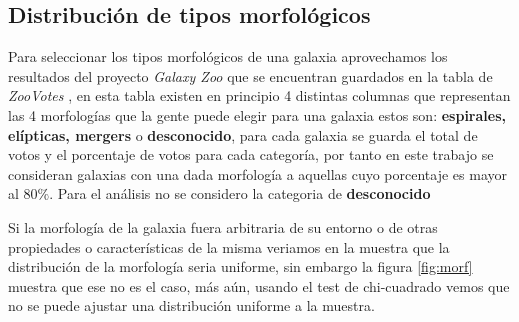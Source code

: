 \documentclass[twocolumn]{article}
\begin{document}
\subsection{Distribución de tipos morfológicos}
Para seleccionar los tipos morfológicos de una galaxia aprovechamos los resultados del proyecto \textit{Galaxy Zoo} que se encuentran guardados en la tabla de \textit{ZooVotes} \citep{zoovotes}, en esta tabla existen en principio 4 distintas columnas que representan las 4 morfologías que la gente puede elegir para una galaxia estos son: \textbf{espirales, elípticas, mergers} o \textbf{desconocido}, para cada galaxia se guarda el total de votos y el porcentaje de votos para cada categoría, por tanto en este trabajo se consideran galaxias con una dada morfología a aquellas cuyo porcentaje es mayor al $80\%$. Para el análisis no se considero la categoria de \textbf{desconocido} 

Si la morfología de la galaxia fuera arbitraria de su entorno o de otras propiedades o características de la misma veriamos en la muestra que la distribución de la morfología seria uniforme, sin embargo la figura \ref{fig:morf} muestra que ese no es el caso, más aún, usando el test de chi-cuadrado vemos que no se puede ajustar una distribución uniforme a la muestra.
\end{document}
